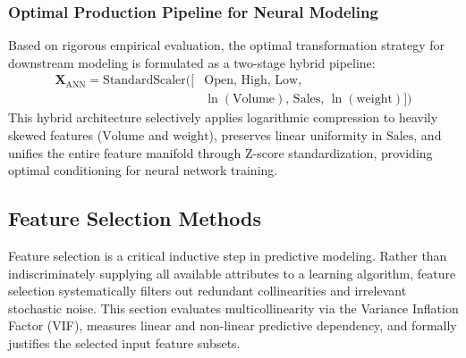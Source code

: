 \documentclass[conference]{IEEEtran}
\begin{document}
\subsubsection{Optimal Production Pipeline for Neural Modeling}
Based on rigorous empirical evaluation, the optimal transformation strategy for downstream modeling is formulated as a two-stage hybrid pipeline:
\begin{equation}
\begin{split}
    \mathbf{X}_{\text{ANN}} = \text{StandardScaler}\Big( \big[ & \text{Open},\, \text{High},\, \text{Low}, \\
    & \ln(\text{Volume}),\, \text{Sales},\, \ln(\text{weight}) \big] \Big)
\end{split}
\end{equation}
This hybrid architecture selectively applies logarithmic compression to heavily skewed features ($\text{Volume}$ and $\text{weight}$), preserves linear uniformity in $\text{Sales}$, and unifies the entire feature manifold through Z-score standardization, providing optimal conditioning for neural network training.


\subsection{Feature Selection Methods}
\label{sec:feature_selection}

Feature selection is a critical inductive step in predictive modeling. Rather than indiscriminately supplying all available attributes to a learning algorithm, feature selection systematically filters out redundant collinearities and irrelevant stochastic noise. This section evaluates multicollinearity via the Variance Inflation Factor (VIF), measures linear and non-linear predictive dependency, and formally justifies the selected input feature subsets.
\end{document}
